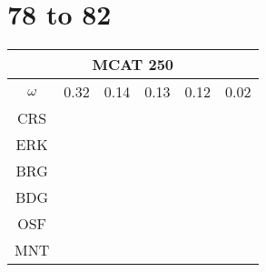 \documentclass[a4paper,12pt]{article}
\begin{document}
\centering
\section*{78 to 82}
\begin{tabular}{|c|c|c|c|c|c|} %
         \hline \multicolumn{6}{|c|}{MCAT 250} \\ \hline
         $\omega$&0.32&0.14&0.13&0.12&0.02 \\ \hline %
        CRS&\cellcolor[HTML]{E41A1C}&\cellcolor[HTML]{E41A1C}&\cellcolor[HTML]{E41A1C}&\cellcolor[HTML]{E41A1C}&\cellcolor[HTML]{E41A1C}\\ \hline %
        ERK&\cellcolor[HTML]{377EB8}&\cellcolor[HTML]{377EB8}&\cellcolor[HTML]{377EB8}&\cellcolor[HTML]{377EB8}&\cellcolor[HTML]{377EB8}\\ \hline %
        BRG&\cellcolor[HTML]{4DAF4A}&\cellcolor[HTML]{4DAF4A}&\cellcolor[HTML]{4DAF4A}&\cellcolor[HTML]{4DAF4A}&\cellcolor[HTML]{4DAF4A}\\ \hline %
        BDG&\cellcolor[HTML]{4DAF4A}&\cellcolor[HTML]{4DAF4A}&\cellcolor[HTML]{4DAF4A}&\cellcolor[HTML]{4DAF4A}&\cellcolor[HTML]{4DAF4A}\\ \hline %
        OSF&\cellcolor[HTML]{984EA3}&\cellcolor[HTML]{984EA3}&\cellcolor[HTML]{984EA3}&\cellcolor[HTML]{984EA3}&\cellcolor[HTML]{4DAF4A}\\ \hline %
        MNT&\cellcolor[HTML]{984EA3}&\cellcolor[HTML]{984EA3}&\cellcolor[HTML]{984EA3}&\cellcolor[HTML]{984EA3}&\cellcolor[HTML]{984EA3}\\ \hline %

\end{tabular}
\end{document}
